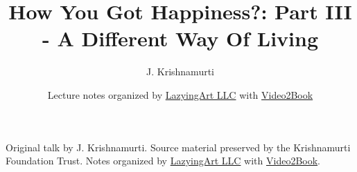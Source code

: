 \documentclass[11pt,oneside]{book}
\begin{document}
\frontmatter
\title{How You Got Happiness?: Part III - A Different Way Of Living}
\author{J. Krishnamurti}
\date{Lecture notes organized by \href{https://lazying.art}{LazyingArt LLC} with \href{https://github.com/lachlanchen/Video2Book}{Video2Book}}
\maketitle
\begin{center}
\small Original talk by J. Krishnamurti. Source material preserved by the Krishnamurti Foundation Trust. Notes organized by \href{https://lazying.art}{LazyingArt LLC} with \href{https://github.com/lachlanchen/Video2Book}{Video2Book}.
\end{center}
\clearpage
\mainmatter

\end{document}

